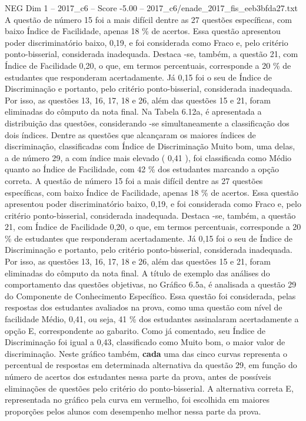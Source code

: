 \begin{textsample}{NEG Dim 1 – 2017\_c6 – Score -5.00 – 2017\_c6/enade\_2017\_fis\_eeb3bfda27.txt}
A questão de número 15 foi a mais difícil dentre as 27 questões específicas, com baixo Índice de Facilidade, apenas 18 \% de acertos.
Essa questão apresentou poder discriminatório baixo, 0,19, e foi considerada como Fraco e, pelo critério ponto-bisserial, considerada inadequada.
Destaca -se, também, a questão 21, com Índice de Facilidade 0,20, o que, em termos percentuais, corresponde a 20 \% de estudantes que responderam acertadamente.
Já 0,15 foi o seu de Índice de Discriminação e portanto, pelo critério ponto-bisserial, considerada inadequada.
Por isso, as questões 13, 16, 17, 18 e 26, além das questões 15 e 21, foram eliminadas do cômputo da nota final.
Na Tabela 6.12a, é apresentada a distribuição das questões, considerando -se simultaneamente a classificação dos dois índices.
Dentre as questões que alcançaram os maiores índices de discriminação, classificadas com Índice de Discriminação Muito bom, uma delas, a de número 29, a com índice mais elevado ( 0,41 ), foi classificada como Médio quanto ao Índice de Facilidade, com 42 \% dos estudantes marcando a opção correta.
A questão de número 15 foi a mais difícil dentre as 27 questões específicas, com baixo Índice de Facilidade, apenas 18 \% de acertos.
Essa questão apresentou poder discriminatório baixo, 0,19, e foi considerada como Fraco e, pelo critério ponto-bisserial, considerada inadequada.
Destaca -se, também, a questão 21, com Índice de Facilidade 0,20, o que, em termos percentuais, corresponde a 20 \% de estudantes que responderam acertadamente.
Já 0,15 foi o seu de Índice de Discriminação e portanto, pelo critério ponto-bisserial, considerada inadequada.
Por isso, as questões 13, 16, 17, 18 e 26, além das questões 15 e 21, foram eliminadas do cômputo da nota final.
A título de exemplo das análises do comportamento das questões objetivas, no Gráfico 6.5a, é analisada a questão 29 do Componente de Conhecimento Específico.
Essa questão foi considerada, pelas respostas dos estudantes avaliados na prova, como uma questão com nível de facilidade Médio, 0,41, ou seja, 41 \% dos estudantes assinalaram acertadamente a opção E, correspondente ao gabarito.
Como já comentado, seu Índice de Discriminação foi igual a 0,43, classificado como Muito bom, o maior valor de discriminação.
Neste gráfico também, \textbf{cada} uma das cinco curvas representa o percentual de respostas em determinada alternativa da questão 29, em função do número de acertos dos estudantes nessa parte da prova, antes de possíveis eliminações de questões pelo critério do ponto-bisserial.
A alternativa correta E, representada no gráfico pela curva em vermelho, foi escolhida em maiores proporções pelos alunos com desempenho melhor nessa parte da prova.

\end{textsample}
